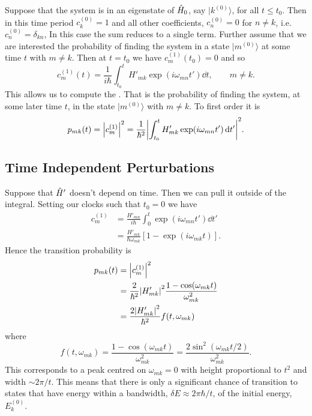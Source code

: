 \documentclass[a4paper]{article}
\renewcommand{\ket}[1]{\vert {#1} \rangle}
\begin{document}
    Suppose that the system is in an eigenstate of \(\hat{H}_0\), say \(\ket{k^{(0)}}\), for all \(t \le t_0\).
    Then in this time period \(c_k^{(0)} = 1\) and all other coefficients, \(c_n^{(0)} = 0\) for \(n \ne k\), i.e. \(c_n^{(0)} = \delta_{kn}\),
    In this case the sum reduces to a single term.
    Further assume that we are interested the probability of finding the system in a state \(\ket{m^{(0)}}\) at some time \(t\) with \(m \ne k\).
    Then at \(t = t_0\) we have \(c_m^{(1)}(t_0) = 0\) and so
    \[c_m^{(1)}(t) = \frac{1}{i\hbar} \int_{t_0}^{t} H'_{mk}\exp(i\omega_{mn}t')\dd{t}, \qquad m\ne k.\]
    This allows us to compute the .
    That is the probability of finding the system, at some later time \(t\), in the state \(\ket{m^{(0)}}\) with \(m\ne k\).
    To first order it is
    \[p_{mk}(t) = \abs{c_m^{(1)}}^2 = \frac{1}{\hbar^2} \abs{\int_{t_0}^{t} H'_{mk}\exp(i\omega_{mn}t')\dd{t'}}^2.\]
    
    \subsection{Time Independent Perturbations}
    Suppose that \(\hat{H}'\) doesn't depend on time.
    Then we can pull it outside of the integral.
    Setting our clocks such that \(t_0 = 0\) we have
    \begin{align*}
        c_m^{(1)} &= \frac{H'_{mn}}{i\hbar} \int_0^t \exp(i\omega_{mn}t')\dd{t'}\\
        &= \frac{H'_{mk}}{\hbar\omega_{mk}}[1 - \exp(i\omega_{mk}t)].
    \end{align*}
    Hence the transition probability is
    \begin{align*}
        p_{mk}(t) &= \abs{c_m^{(1)}}^2\\
        &= \frac{2}{\hbar^2}\abs{H'_{mk}}^2\frac{1 - \cos(\omega_{mk}t)}{\omega_{mk}^2}\\
        &= \frac{2\abs{H'_{mk}}^2}{\hbar^2}f(t, \omega_{mk})
    \end{align*}
    where
    \[f(t, \omega_{mk}) = \frac{1 - \cos(\omega_{mk}t)}{\omega_{mk}^2} = \frac{2\sin^2(\omega_{mk}t/2)}{\omega_{mk}^2}.\]
    This corresponds to a peak centred on \(\omega_{mk} = 0\) with height proportional to \(t^2\) and width \(\sim 2\pi/t\).
    This means that there is only a significant chance of transition to states that have energy within a bandwidth, \(\delta E \approx 2\pi\hbar/t\), of the initial energy, \(E_k^{(0)}\).
    
\end{document}
